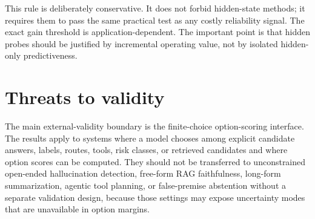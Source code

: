 \documentclass[preprint,12pt,authoryear]{elsarticle}
\begin{document}
\begin{center}
\end{center}


This rule is deliberately conservative. It does not forbid hidden-state methods; it requires them to pass the same practical test as any costly reliability signal. The exact gain threshold is application-dependent. The important point is that hidden probes should be justified by incremental operating value, not by isolated hidden-only predictiveness.


\section{Threats to validity}
The main external-validity boundary is the finite-choice option-scoring interface. The results apply to systems where a model chooses among explicit candidate answers, labels, routes, tools, risk classes, or retrieved candidates and where option scores can be computed. They should not be transferred to unconstrained open-ended hallucination detection, free-form RAG faithfulness, long-form summarization, agentic tool planning, or false-premise abstention without a separate validation design, because those settings may expose uncertainty modes that are unavailable in option margins.
\end{document}
